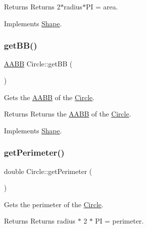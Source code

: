 \begin{DoxyReturn}{Returns}
Returns 2$\ast$radius$\ast$\+PI = area. 
\end{DoxyReturn}


Implements \mbox{\hyperlink{class_shape_acec2178598665e96b85f1ac6a13a47b9}{Shape}}.

\mbox{\label{class_circle_a7df161b9fa0dce04ed01f7924658faf3}} 
\subsubsection{\texorpdfstring{getBB()}{getBB()}}
{\footnotesize\ttfamily \mbox{\hyperlink{class_a_a_b_b}{A\+A\+BB}} Circle\+::get\+BB (\begin{DoxyParamCaption}{ }\end{DoxyParamCaption})\hspace{0.3cm}{\ttfamily [virtual]}}



Gets the \mbox{\hyperlink{class_a_a_b_b}{A\+A\+BB}} of the \mbox{\hyperlink{class_circle}{Circle}}. 

\begin{DoxyReturn}{Returns}
Returns the \mbox{\hyperlink{class_a_a_b_b}{A\+A\+BB}} of the \mbox{\hyperlink{class_circle}{Circle}}. 
\end{DoxyReturn}


Implements \mbox{\hyperlink{class_shape_a2490226328b30c113a7f07e2edda5f94}{Shape}}.

\mbox{\label{class_circle_afee5f4743c89e48e462e5f56aa605669}} 
\subsubsection{\texorpdfstring{getPerimeter()}{getPerimeter()}}
{\footnotesize\ttfamily double Circle\+::get\+Perimeter (\begin{DoxyParamCaption}{ }\end{DoxyParamCaption})\hspace{0.3cm}{\ttfamily [virtual]}}



Gets the perimeter of the \mbox{\hyperlink{class_circle}{Circle}}. 

\begin{DoxyReturn}{Returns}
Returns radius $\ast$ 2 $\ast$ PI = perimeter. 
\end{DoxyReturn}


